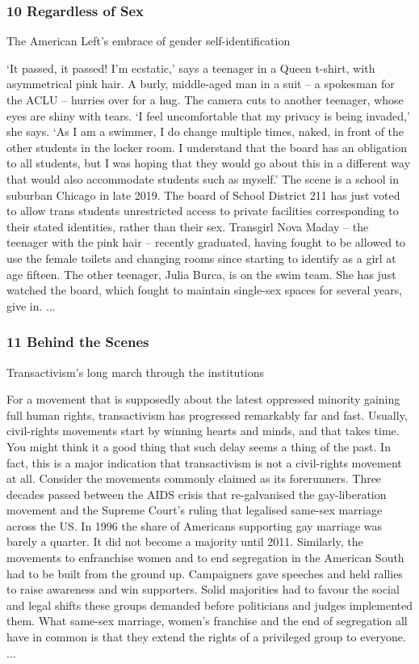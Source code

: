 \documentclass[10pt,titlepage]{book}
\begin{document}
\subsubsection{10 Regardless of Sex}

The American Left’s embrace of gender self-identification

‘It passed, it passed! I’m ecstatic,’ says a teenager in a Queen t-shirt, with asymmetrical pink hair. A burly, middle-aged man in a suit – a spokesman for the ACLU – hurries over for a hug. The camera cuts to another teenager, whose eyes are shiny with tears. ‘I feel uncomfortable that my privacy is being invaded,’ she says. ‘As I am a swimmer, I do change multiple times, naked, in front of the other students in the locker room. I understand that the board has an obligation to all students, but I was hoping that they would go about this in a different way that would also accommodate students such as myself.’ The scene is a school in suburban Chicago in late 2019. The board of School District 211 has just voted to allow trans students unrestricted access to private facilities corresponding to their stated identities, rather than their sex. Transgirl Nova Maday – the teenager with the pink hair – recently graduated, having fought to be allowed to use the female toilets and changing rooms since starting to identify as a girl at age fifteen. The other teenager, Julia Burca, is on the swim team. She has just watched the board, which fought to maintain single-sex spaces for several years, give in.
...

\subsubsection{11 Behind the Scenes}

Transactivism’s long march through the institutions

For a movement that is supposedly about the latest oppressed minority gaining full human rights, transactivism has progressed remarkably far and fast. Usually, civil-rights movements start by winning hearts and minds, and that takes time. You might think it a good thing that such delay seems a thing of the past. In fact, this is a major indication that transactivism is not a civil-rights movement at all. Consider the movements commonly claimed as its forerunners. Three decades passed between the AIDS crisis that re-galvanised the gay-liberation movement and the Supreme Court’s ruling that legalised same-sex marriage across the US. In 1996 the share of Americans supporting gay marriage was barely a quarter. It did not become a majority until 2011. Similarly, the movements to enfranchise women and to end segregation in the American South had to be built from the ground up. Campaigners gave speeches and held rallies to raise awareness and win supporters. Solid majorities had to favour the social and legal shifts these groups demanded before politicians and judges implemented them. What same-sex marriage, women’s franchise and the end of segregation all have in common is that they extend the rights of a privileged group to everyone.
...
\end{document}
